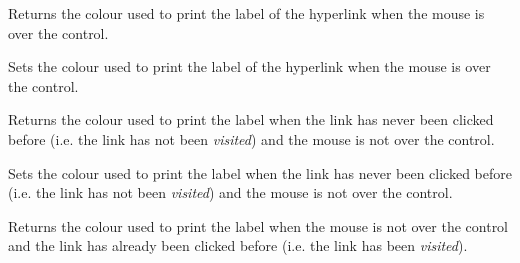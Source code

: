 




\label{wxhyperlinkctrlgethovercolour}


Returns the colour used to print the label of the hyperlink when the mouse is over the control.


\label{wxhyperlinkctrlsethovercolour}


Sets the colour used to print the label of the hyperlink when the mouse is over the control.


\label{wxhyperlinkctrlgetnormalcolour}


Returns the colour used to print the label when the link has never been clicked before
(i.e. the link has not been {\it visited}) and the mouse is not over the control.


\label{wxhyperlinkctrlsetnormalcolour}


Sets the colour used to print the label when the link has never been clicked before
(i.e. the link has not been {\it visited}) and the mouse is not over the control.


\label{wxhyperlinkctrlgetvisitedcolour}


Returns the colour used to print the label when the mouse is not over the control
and the link has already been clicked before (i.e. the link has been {\it visited}).


\label{wxhyperlinkctrlsetvisitedcolour}


